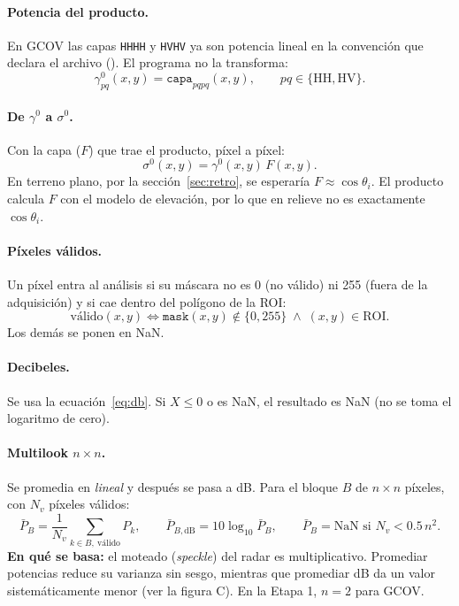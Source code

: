 \documentclass[11pt,a4paper]{article}
\newcommand{\gz}{\ensuremath{\gamma^{0}}}
\newcommand{\sz}{\ensuremath{\sigma^{0}}}
\begin{document}
\paragraph{Potencia del producto.} En GCOV las capas \texttt{HHHH} y \texttt{HVHV} ya son potencia lineal en la convención que declara
el archivo (). El programa no la transforma:
\begin{equation}
  \gamma^0_{pq}(x,y) = \texttt{capa}_{pqpq}(x,y), \qquad pq \in \{\text{HH}, \text{HV}\}.
\end{equation}

\paragraph{De \gz{} a \sz.} Con la capa  ($F$) que trae el producto, píxel a píxel:
\begin{equation}
  \sigma^0(x,y) = \gamma^0(x,y)\, F(x,y).
  \label{eq:gamma-sigma}
\end{equation}
En terreno plano, por la sección~\ref{sec:retro}, se esperaría $F \approx \cos\theta_i$. El producto calcula $F$ con el modelo de elevación, por lo
que en relieve no es exactamente $\cos\theta_i$.

\paragraph{Píxeles válidos.} Un píxel entra al análisis si su máscara no es 0 (no válido) ni 255 (fuera de la adquisición) y si cae
dentro del polígono de la ROI:
\begin{equation}
  \text{válido}(x,y) \iff \texttt{mask}(x,y) \notin \{0, 255\} \;\wedge\; (x,y) \in \text{ROI}.
\end{equation}
Los demás se ponen en NaN.

\paragraph{Decibeles.} Se usa la ecuación~\eqref{eq:db}. Si $X \le 0$ o es NaN, el resultado es NaN (no se toma el logaritmo de
cero).

\paragraph{Multilook $n\times n$.} Se promedia en \emph{lineal} y después se pasa a dB. Para el bloque $B$ de $n\times n$ píxeles, con
$N_v$ píxeles válidos:
\begin{equation}
  \bar{P}_B = \frac{1}{N_v}\sum_{k \in B,\ \text{válido}} P_k,
  \qquad
  \bar{P}_{B,\text{dB}} = 10\log_{10}\bar{P}_B,
  \qquad
  \bar{P}_B = \text{NaN si } N_v < 0.5\,n^2 .
  \label{eq:multilook}
\end{equation}
\textbf{En qué se basa:} el moteado (\emph{speckle}) del radar es multiplicativo. Promediar potencias reduce su varianza sin sesgo,
mientras que promediar dB da un valor sistemáticamente menor (ver la figura C). En la Etapa 1, $n = 2$ para GCOV.
\end{document}
